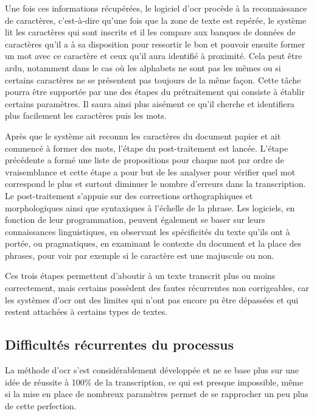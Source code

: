 Une fois ces informations récupérées, le logiciel d'\acrshort{ocr} procède à la reconnaissance de caractères, c'est-à-dire qu'une fois que la zone de texte est repérée, le système lit les caractères qui sont inscrits et il les compare aux banques de données de caractères qu'il a à sa disposition pour ressortir le bon et pouvoir ensuite former un mot avec ce caractère et ceux qu'il aura identifié à proximité. Cela peut être ardu, notamment dans le cas où les alphabets ne sont pas les mêmes ou si certains caractères ne se présentent pas toujours de la même façon. Cette tâche pourra être supportée par une des étapes du prétraitement qui consiste à établir certains paramètres. Il saura ainsi plus aisément ce qu'il cherche et identifiera plus facilement les caractères puis les mots.

Après que le système ait reconnu les caractères du document papier et ait commencé à former des mots, l'étape du post-traitement est lancée. L'étape précédente a formé une liste de propositions pour chaque mot par ordre de vraisemblance et cette étape a pour but de les analyser pour vérifier quel mot correspond le plus et surtout diminuer le nombre d'erreurs dans la transcription. Le post-traitement s'appuie sur des corrections orthographiques et morphologiques ainsi que syntaxiques à l'échelle de la phrase. Les logiciels, en fonction de leur programmation, peuvent également se baser sur leurs connaissances linguistiques, en observant les spécificités du texte qu'ils ont à portée, ou pragmatiques, en examinant le contexte du document et la place des phrases, pour voir par exemple si le caractère est une majuscule ou non.

Ces trois étapes permettent d'aboutir à un texte transcrit plus ou moins correctement, mais certains possèdent des fautes récurrentes non corrigeables, car les systèmes d'\acrshort{ocr} ont des limites qui n'ont pas encore pu être dépassées et qui restent attachées à certains types de textes.

\subsection{Difficultés récurrentes du processus}
La méthode d'\acrshort{ocr} s'est considérablement développée et ne se base plus sur une idée de réussite à 100\% de la transcription, ce qui est presque impossible, même si la mise en place de nombreux paramètres permet de se rapprocher un peu plus de cette perfection. 

